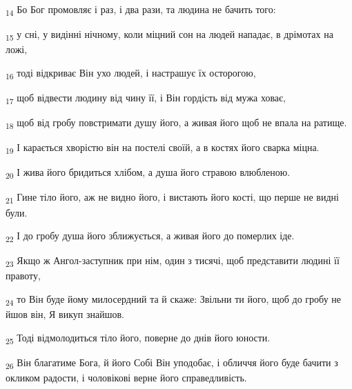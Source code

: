 \begin{tcolorbox}
\textsubscript{14} Бо Бог промовляє і раз, і два рази, та людина не бачить того:
\end{tcolorbox}
\begin{tcolorbox}
\textsubscript{15} у сні, у видінні нічному, коли міцний сон на людей нападає, в дрімотах на ложі,
\end{tcolorbox}
\begin{tcolorbox}
\textsubscript{16} тоді відкриває Він ухо людей, і настрашує їх осторогою,
\end{tcolorbox}
\begin{tcolorbox}
\textsubscript{17} щоб відвести людину від чину її, і Він гордість від мужа ховає,
\end{tcolorbox}
\begin{tcolorbox}
\textsubscript{18} щоб від гробу повстримати душу його, а живая його щоб не впала на ратище.
\end{tcolorbox}
\begin{tcolorbox}
\textsubscript{19} І карається хворістю він на постелі своїй, а в костях його сварка міцна.
\end{tcolorbox}
\begin{tcolorbox}
\textsubscript{20} І жива його бридиться хлібом, а душа його стравою влюбленою.
\end{tcolorbox}
\begin{tcolorbox}
\textsubscript{21} Гине тіло його, аж не видно його, і вистають його кості, що перше не видні були.
\end{tcolorbox}
\begin{tcolorbox}
\textsubscript{22} І до гробу душа його зближується, а живая його до померлих іде.
\end{tcolorbox}
\begin{tcolorbox}
\textsubscript{23} Якщо ж Ангол-заступник при нім, один з тисячі, щоб представити людині її правоту,
\end{tcolorbox}
\begin{tcolorbox}
\textsubscript{24} то Він буде йому милосердний та й скаже: Звільни ти його, щоб до гробу не йшов він, Я викуп знайшов.
\end{tcolorbox}
\begin{tcolorbox}
\textsubscript{25} Тоді відмолодиться тіло його, поверне до днів його юности.
\end{tcolorbox}
\begin{tcolorbox}
\textsubscript{26} Він благатиме Бога, й його Собі Він уподобає, і обличчя його буде бачити з окликом радости, і чоловікові верне його справедливість.
\end{tcolorbox}
